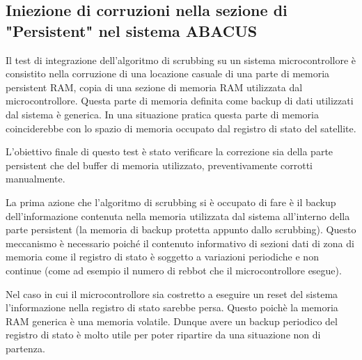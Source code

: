 \documentclass[LaM,binding=0.6cm,oneside]{../sapthesis}
\begin{document}
\subsection{Iniezione di corruzioni nella sezione di "Persistent" nel sistema ABACUS}

Il test di integrazione dell'algoritmo di scrubbing su un sistema microcontrollore è consistito nella corruzione di una locazione casuale di una parte di memoria persistent RAM, copia di una sezione di memoria RAM utilizzata dal microcontrollore. 
Questa parte di memoria definita come backup di dati utilizzati dal sistema è generica. In una situazione pratica questa parte di memoria coinciderebbe con lo spazio di memoria occupato dal registro di stato del satellite.

L'obiettivo finale di questo test è stato verificare la correzione sia della parte persistent che del buffer di memoria utilizzato, preventivamente corrotti manualmente.

La prima azione che l'algoritmo di scrubbing si è occupato di fare è il backup dell'informazione contenuta nella memoria utilizzata dal sistema all'interno della parte persistent (la memoria di backup protetta appunto dallo scrubbing). Questo meccanismo è necessario poiché il contenuto informativo di sezioni dati di zona di memoria come il registro di stato è soggetto a variazioni periodiche e non continue (come ad esempio il numero di rebbot che il microcontrollore esegue). 

Nel caso in cui il microcontrollore sia costretto a eseguire un reset del sistema l'informazione nella registro di stato sarebbe persa. Questo poichè la memoria RAM generica è una memoria volatile. Dunque avere un backup periodico del registro di stato è molto utile per poter ripartire da una situazione non di partenza.
\end{document}
